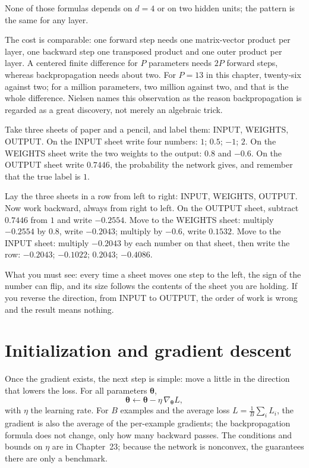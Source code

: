 None of those formulas depends on $d=4$ or on two hidden units; the pattern is the same for any
layer.

The cost is comparable: one forward step needs one matrix-vector product per layer, one backward
step one transposed product and one outer product per layer. A centered finite difference for $P$
parameters needs $2P$ forward steps, whereas backpropagation needs about two. For $P=13$ in this
chapter, twenty-six against two; for a million parameters, two million against two, and that is
the whole difference. Nielsen names this observation as the reason backpropagation is regarded
as a great discovery, not merely an algebraic trick.

\begin{tangan}
Take three sheets of paper and a pencil, and label them: INPUT, WEIGHTS, OUTPUT. On the INPUT
sheet write four numbers: $1$; $0.5$; $-1$; $2$. On the WEIGHTS sheet write the two weights to
the output: $0.8$ and $-0.6$. On the OUTPUT sheet write $0.7446$, the probability the network
gives, and remember that the true label is $1$.

Lay the three sheets in a row from left to right: INPUT, WEIGHTS, OUTPUT. Now work backward,
always from right to left. On the OUTPUT sheet, subtract $0.7446$ from $1$ and write $-0.2554$.
Move to the WEIGHTS sheet: multiply $-0.2554$ by $0.8$, write $-0.2043$; multiply by $-0.6$,
write $0.1532$. Move to the INPUT sheet: multiply $-0.2043$ by each number on that sheet, then
write the row: $-0.2043$; $-0.1022$; $0.2043$; $-0.4086$.

What you must see: every time a sheet moves one step to the left, the sign of the number can
flip, and its size follows the contents of the sheet you are holding. If you reverse the
direction, from INPUT to OUTPUT, the order of work is wrong and the result means nothing.
\end{tangan}


\section{Initialization and gradient descent}

Once the gradient exists, the next step is simple: move a little in the direction that lowers the
loss. For all parameters $\boldsymbol{\theta}$,
\[
  \boldsymbol{\theta}\leftarrow\boldsymbol{\theta}-\eta\,\nabla_{\boldsymbol{\theta}}L,
\]
with $\eta$ the learning rate. For $B$ examples and the average loss
$L=\frac{1}{B}\sum_{i}L_{i}$, the gradient is also the average of the per-example gradients; the
backpropagation formula does not change, only how many backward passes. The conditions and
bounds on $\eta$ are in Chapter~23; because the network is nonconvex, the guarantees there are
only a benchmark.

